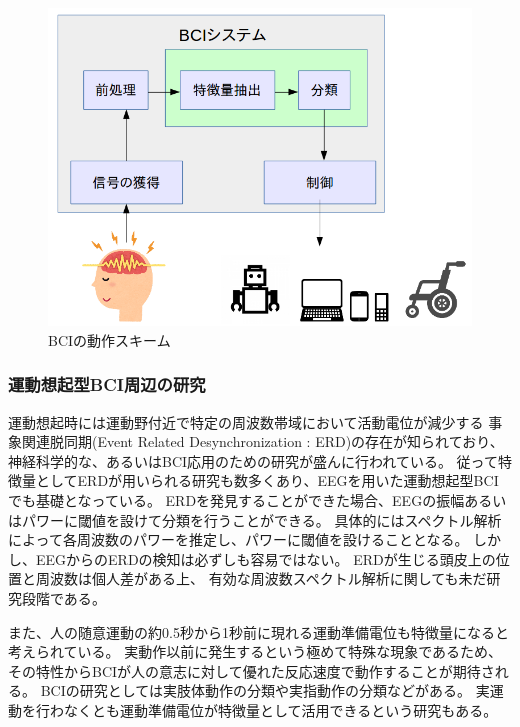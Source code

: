 \begin{figure}[tb]
    \centering
    \includegraphics[width=13cm]{images/BCIsystem.png}
    \caption{BCIの動作スキーム}
    \label{fig:BCIsystem}
\end{figure}

\subsubsection{\mc 運動想起型\rm BCI\mc 周辺の研究}
運動想起時には運動野付近で特定の周波数帯域において活動電位が減少する
事象関連脱同期(Event Related Desynchronization : ERD)の存在が知られており、
神経科学的な、あるいはBCI応用のための研究が盛んに行われている\cite{ERDとERS,ERDリハビリ,運動フィードバック}。
従って特徴量としてERDが用いられる研究も数多くあり、EEGを用いた運動想起型BCIでも基礎となっている\cite{プリミティブERD,Beta波によるBCI,waveletFSVM}。
ERDを発見することができた場合、EEGの振幅あるいはパワーに閾値を設けて分類を行うことができる。
具体的にはスペクトル解析によって各周波数のパワーを推定し、パワーに閾値を設けることとなる。
しかし、EEGからのERDの検知は必ずしも容易ではない。
ERDが生じる頭皮上の位置と周波数は個人差がある上、
有効な周波数スペクトル解析に関しても未だ研究段階である\cite{時間周波数解析の比較}。

また、人の随意運動の約0.5秒から1秒前に現れる運動準備電位も特徴量になると考えられている。
実動作以前に発生するという極めて特殊な現象であるため、
その特性からBCIが人の意志に対して優れた反応速度で動作することが期待される。
BCIの研究としては実肢体動作の分類\cite{運動準備電位肢体}や実指動作の分類\cite{運動準備電位指}などがある。
実運動を行わなくとも運動準備電位が特徴量として活用できるという研究\cite{運動準備電位想起,運動準備電位想起2}もある。

